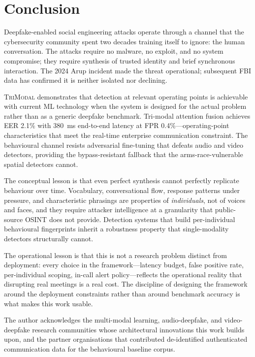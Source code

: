 \documentclass[sigconf,nonacm]{acmart}
\begin{document}
\section{Conclusion}

Deepfake-enabled social engineering attacks operate through a channel
that the cybersecurity community spent two decades training itself to
ignore: the human conversation. The attacks require no malware, no
exploit, and no system compromise; they require synthesis of trusted
identity and brief synchronous interaction. The 2024 Arup incident
made the threat operational; subsequent FBI data has confirmed it is
neither isolated nor declining.

\textsc{TriModal} demonstrates that detection at relevant operating
points is achievable with current ML technology when the system is
designed for the actual problem rather than as a generic deepfake
benchmark. Tri-modal attention fusion achieves EER 2.1\% with 380~ms
end-to-end latency at FPR 0.4\%---operating-point characteristics that
meet the real-time enterprise communication constraint. The behavioural
channel resists adversarial fine-tuning that defeats audio and video
detectors, providing the bypass-resistant fallback that the
arms-race-vulnerable spatial detectors cannot.

The conceptual lesson is that even perfect synthesis cannot perfectly
replicate behaviour over time. Vocabulary, conversational flow, response
patterns under pressure, and characteristic phrasings are properties of
\emph{individuals}, not of voices and faces, and they require attacker
intelligence at a granularity that public-source OSINT does not
provide. Detection systems that build per-individual behavioural
fingerprints inherit a robustness property that single-modality
detectors structurally cannot.

The operational lesson is that this is not a research problem distinct
from deployment: every choice in the framework---latency budget, false
positive rate, per-individual scoping, in-call alert policy---reflects
the operational reality that disrupting real meetings is a real cost.
The discipline of designing the framework around the deployment
constraints rather than around benchmark accuracy is what makes this
work usable.

\begin{acks}
The author acknowledges the multi-modal learning, audio-deepfake, and
video-deepfake research communities whose architectural innovations
this work builds upon, and the partner organisations that contributed
de-identified authenticated communication data for the behavioural
baseline corpus.
\end{acks}
\end{document}
